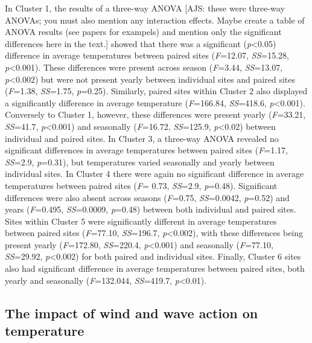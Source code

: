 \documentclass[12pt,A4paper,]{article}
\begin{document}
In Cluster 1, the results of a three-way ANOVA {[}AJS: these were
three-way ANOVAs; you must also mention any interaction effects. Maybe
create a table of ANOVA results (see papers for exampels) and mention
only the significant differences here in the text.{]} showed that there
was a significant (\emph{p}\textless{}0.05) difference in average
temperatures between paired sites (\emph{F}=12.07, \emph{SS}=15.28,
\emph{p}\textless{}0.001). These differences were present across season
(\emph{F}=3.44, \emph{SS}=13.07, \emph{p}\textless{}0.002) but were not
present yearly between individual sites and paired sites (\emph{F}=1.38,
\emph{SS}=1.75, \emph{p}=0.25). Similarly, paired sites within Cluster 2
also displayed a significantly difference in average temperature
(\emph{F}=166.84, \emph{SS}=418.6, \emph{p}\textless{}0.001). Conversely
to Cluster 1, however, these differences were present yearly
(\emph{F}=33.21, \emph{SS}=41.7, \emph{p}\textless{}0.001) and
seasonally (\emph{F}=16.72, \emph{SS}=125.9, \emph{p}\textless{}0.02)
between individual and paired sites. In Cluster 3, a three-way ANOVA
revealed no significant differences in average temperatures between
paired sites (\emph{F}=1.17, \emph{SS}=2.9, \emph{p}=0.31), but
temperatures varied seasonally and yearly between individual sites. In
Cluster 4 there were again no significant difference in average
temperatures between paired sites (\emph{F}= 0.73, \emph{SS}=2.9,
\emph{p}=0.48). Significant differences were also absent across seasons
(\emph{F}=0.75, \emph{SS}=0.0042, \emph{p}=0.52) and years
(\emph{F}=0.495, \emph{SS}=0.0009, \emph{p}=0.48) between both
individual and paired sites. Sites within Cluster 5 were significantly
different in average temperatures between paired sites (\emph{F}=77.10,
\emph{SS}=196.7, \emph{p}\textless{}0.002), with these differences being
present yearly (\emph{F}=172.80, \emph{SS}=220.4,
\emph{p}\textless{}0.001) and seasonally (\emph{F}=77.10,
\emph{SS}=29.92, \emph{p}\textless{}0.002) for both paired and
individual sites. Finally, Cluster 6 sites also had significant
difference in average temperatures between paired sites, both yearly and
seasonally (\emph{F}=132.044, \emph{SS}=419.7, \emph{p}\textless{}0.01).

\subsection{The impact of wind and wave action on
temperature}\label{the-impact-of-wind-and-wave-action-on-temperature}
\end{document}
